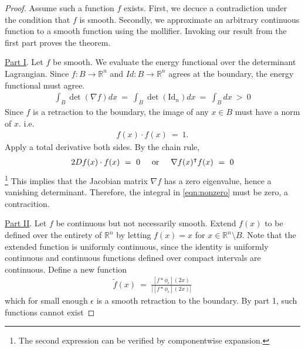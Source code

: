 \documentclass[10pt]{article}
\numberwithin{equation}{section}
\newcommand{\textOr}{
    {
        \hspace{5mm}
        \textrm{or}
        \hspace{5mm}
    }
}
\newcommand{\RR}{\mathbb{R}}
\numberwithin{theorem}{section}
\numberwithin{proposition}{section}
\numberwithin{lemma}{section}
\numberwithin{corollary}{section}
\numberwithin{remark}{section}
\numberwithin{definition}{section}
\numberwithin{example}{section}
\numberwithin{conjecture}{section}
\numberwithin{question}{section}
\begin{document}
    \begin{proof}
        Assume such a function $f$ exists. First, we decuce a contradiction 
        under the condition that $f$ is smooth. Secondly, we approximate 
        an arbitrary continuous function to a smooth function using the mollifier. 
        Invoking our result from the first part proves the theorem. 

        \underline{Part I}. Let $f$ be smooth. We evaluate the energy 
        functional over the determinant Lagrangian. Since $f:B\rightarrow \RR^n$
         and $Id:B\rightarrow \RR^n$ agrees at the boundary, the energy 
         functional must agree. 
         \begin{align}\label{eqn:nonzeero}
            \int_B \det(\nabla f) dx \ = \ \int_B\det(\text{Id}_n) dx \ = \ 
            \int_B dx \ > \ 0
         \end{align}
        Since $f$ is a retraction to the boundary, the image of any $x \in B$ 
        must have a norm of $x$. i.e.
        \begin{align}
            f(x) \cdot f(x) \ = \ 1.
        \end{align}
        Apply a total derivative both sides. By the chain rule, 
        \begin{align}
            2 Df(x) \cdot f(x) \ = \ 0 \textOr \nabla f(x)^\intercal f(x) \ = \ 0
        \end{align}
        \footnote{The second expression can be verified by componentwise expansion. }
        This implies that the Jacobian matrix $\nabla f$ has a zero eigenvalue, 
        hence a vanishing determinant. Therefore, the integral in \eqref{eqn:nonzero} 
        must be zero, a contracition. 

        \underline{Part II}. Let $f$ be continuous but not necessarily smooth. 
        Extend $f(x)$ to be defined over the entirety of $\RR^n$ by letting 
        $f(x) = x$ for $x \in \RR^n \setminus B$. Note that the extended 
        function is uniformly continuous, since the identity is uniformly continuous 
        and continuous functions defined over compact intervals are continuous. 
        Define a new function 
        \begin{align}
            \tilde f(x) \ = \ \frac{[f*\phi_\epsilon](2x) }{
                \left|[f*\phi_\epsilon](2x)\right|}
        \end{align}
        which for small enough $\epsilon$ is a smooth retraction to the boundary. 
        By part 1, such functions cannot exist

    \end{proof}
\end{document}
